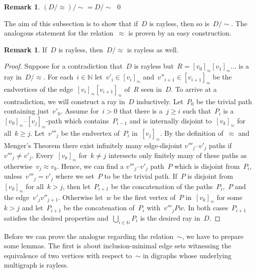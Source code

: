 \documentclass[reqno, 12pt]{amsart}
\numberwithin{equation}{section}
\numberwithin{figure}{section}
\theoremstyle{plain}
\theoremstyle{definition}
\newtheorem{remark}[thm]{Remark}
\begin{document}
\begin{remark}
   \label{rem:rayless-double-quotient}
    ${(D{/}{\approx}){/}{\sim} = D{/}{\sim}}$
    \qed
\end{remark}

The aim of this subsection is to show that if~$D$ is rayless, then so is~${D{/}{\sim}}$. 
The analogous statement for the relation~$\approx$ is proven by an easy construction. 

\begin{remark}
   \label{rem:rayless-quotient-finsep}
    If~$D$ is rayless, then~${D{/}{\approx}}$ is rayless as well.
\end{remark}

\begin{proof}
    Suppose for a contradiction that~$D$ is rayless but~${R = [v_0]_\approx [v_1]_\approx \ldots}$ is a ray in~${D{/}{\approx}}$. 
    For each~${i \in \mathbb{N}}$ let~${v'_i \in [v_i]_\approx}$ and~${v''_{i+1} \in [v_{i+1}]_\approx}$ be the endvertices of the edge~${[v_{i}]_\approx[v_{i+1}]_\approx}$ of~$R$ seen in~$D$. 
    To arrive at a contradiction, we will construct a ray in~$D$ inductively. 
    Let~$P_0$ be the trivial path containing just~$v'_0$. 
    Assume for~${i > 0}$ that there is a~${j \geq i}$ such that~$P_i$ is a ${[v_0]_\approx}$--${[v_j]_\approx}$-path which contains~$P_{i-1}$ and is internally disjoint to~$[v_k]_\approx$ for all~${k \geq j}$. 
    Let~$v'''_j$ be the endvertex of~$P_i$ in~$[v_j]_\approx$. 
    By the definition of~$\approx$ and Menger's Theorem there exist infinitely many edge-disjoint $v'''_j$--$v'_j$ paths if~${v'''_j \neq v'_j}$.
    Every~${[v_k]_\approx}$ for~${k \neq j}$ intersects only finitely many of these paths as otherwise~${v_j \approx v_k}$.
    Hence, we can find a $v'''_j$--$v'_j$ path~$P$ which is disjoint from~$P_i$, unless~${v'''_j = v'_j}$ where we set~$P$ to be the trivial path. 
    If~$P$ is disjoint from~${[v_k]_\approx}$ for all~${k > j}$, then let~$P_{i+1}$ be the concatenation of the paths~$P_i$,~$P$ and the edge~${v'_{j} v''_{j+1}}$. 
    Otherwise let~$w$ be the first vertex of~$P$ in~$[v_k]_\approx$ for some~${k > j}$ and let~$P_{i+1}$ be the concatenation of~$P_i$ with~${v'''_j P w}$. 
    In both cases~$P_{i+1}$ satisfies the desired properties and~${\bigcup_{i \in \mathbb{N}} P_i}$ is the desired ray in~$D$.
\end{proof}

Before we can prove the analogue regarding the relation~$\sim$, we have to prepare some lemmas. 
The first is about inclusion-minimal edge sets witnessing the equivalence of two vertices with respect to~$\sim$ in digraphs whose underlying multigraph is rayless.
\end{document}
